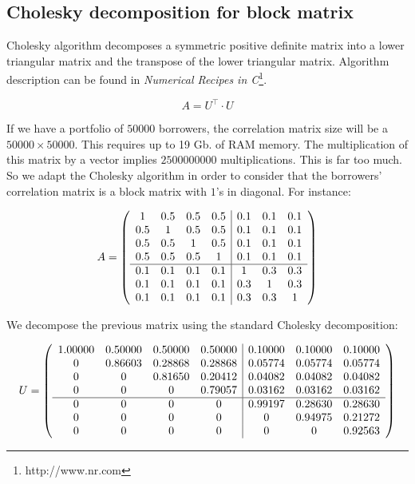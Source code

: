\documentclass[a4paper,12pt,final]{article}
\begin{document}
\subsection{Cholesky decomposition for block matrix}
\label{ap:cholblock}

Cholesky algorithm decomposes a symmetric positive definite matrix into a lower
triangular matrix and the transpose of the lower triangular matrix. Algorithm 
description can be found in \emph{Numerical Recipes in C}\footnote{http://www.nr.com}.

\begin{displaymath}
A = U^{\top} \cdot U
\end{displaymath}

If we have a portfolio of $50000$ borrowers, the correlation matrix size will
be a $50000 \times 50000$. This requires up to 19 Gb. of RAM memory. The 
multiplication of this matrix by a vector implies $2500000000$ multiplications.
This is far too much. So we adapt the Cholesky algorithm in order to consider that 
the borrowers' correlation matrix is a block matrix with $1$'s in diagonal. 
For instance:

\begin{displaymath}
A = \left(
\begin{array}{cccc|ccc}
1   & 0.5 & 0.5 & 0.5 & 0.1 & 0.1 & 0.1 \cr
0.5 & 1   & 0.5 & 0.5 & 0.1 & 0.1 & 0.1 \cr
0.5 & 0.5 & 1   & 0.5 & 0.1 & 0.1 & 0.1 \cr
0.5 & 0.5 & 0.5 & 1   & 0.1 & 0.1 & 0.1 \cr
\hline
0.1 & 0.1 & 0.1 & 0.1 & 1   & 0.3 & 0.3 \cr
0.1 & 0.1 & 0.1 & 0.1 & 0.3 & 1   & 0.3 \cr
0.1 & 0.1 & 0.1 & 0.1 & 0.3 & 0.3 & 1
\end{array}
\right)
\end{displaymath}

We decompose the previous matrix using the standard Cholesky decomposition:

\begin{displaymath}
U = \left(
\begin{array}{cccc|ccc}
 1.00000 & 0.50000 & 0.50000 & 0.50000 & 0.10000 & 0.10000 & 0.10000 \cr
 0       & 0.86603 & 0.28868 & 0.28868 & 0.05774 & 0.05774 & 0.05774 \cr
 0       & 0       & 0.81650 & 0.20412 & 0.04082 & 0.04082 & 0.04082 \cr
 0       & 0       & 0       & 0.79057 & 0.03162 & 0.03162 & 0.03162 \cr
\hline
 0       & 0       & 0       & 0       & 0.99197 & 0.28630 & 0.28630 \cr
 0       & 0       & 0       & 0       & 0       & 0.94975 & 0.21272 \cr
 0       & 0       & 0       & 0       & 0       & 0       & 0.92563
\end{array}
\right)
\end{displaymath}
\end{document}
